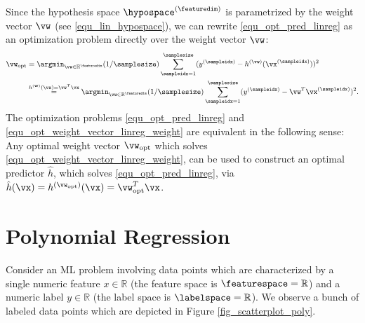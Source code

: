\documentclass[12pt]{report}
\begin{document}
Since the hypothesis space $\hypospace^{(\featuredim)} $ is parametrized by the weight vector $\vw$ (see \eqref{equ_lin_hypospace}), 
we can rewrite \eqref{equ_opt_pred_linreg} as an optimization problem directly over the weight vector $\vw$: 
\begin{align} 
\label{equ_opt_weight_vector_linreg_weight}
\vw_{\rm opt} &  = \argmin_{\vw \in \mathbb{R}^{\featuredim}} (1/\samplesize) \sum_{\sampleidx=1}^{\samplesize} (y^{(\sampleidx)} - h^{(\vw)}(\vx^{(\sampleidx)}))^{2} \nonumber \\
& \stackrel{h^{(\mathbf{w})}(\vx) = \vw^{T} \vx}{=} \argmin_{\vw \in \mathbb{R}^{\featuredim}} (1/\samplesize) \sum_{\sampleidx=1}^{\samplesize} (y^{(\sampleidx)} - \vw^{T} \vx^{(\sampleidx)})^{2}.
\end{align} 
The optimization problems \eqref{equ_opt_pred_linreg} and \eqref{equ_opt_weight_vector_linreg_weight} are equivalent in the following sense: 
Any optimal weight vector $\vw_{\rm opt}$ which solves \eqref{equ_opt_weight_vector_linreg_weight}, can be used to construct an optimal predictor $\hat{h}$, 
which solves \eqref{equ_opt_pred_linreg}, via $\hat{h}(\vx) = h^{(\vw_{\rm opt})}(\vx) = \vw_{\rm opt}^{T} \vx$. 


\section{Polynomial Regression} 
\label{sec_polynomial_regression}


Consider an ML problem involving data points which are characterized by a 
single numeric feature $x \in  \mathbb{R}$ (the feature space is $\featurespace= \mathbb{R}$) 
and a numeric label $y \in \mathbb{R}$ (the label space is $\labelspace= \mathbb{R}$). 
We observe a bunch of labeled data points which are depicted in Figure \ref{fig_scatterplot_poly}. 
\end{document}
